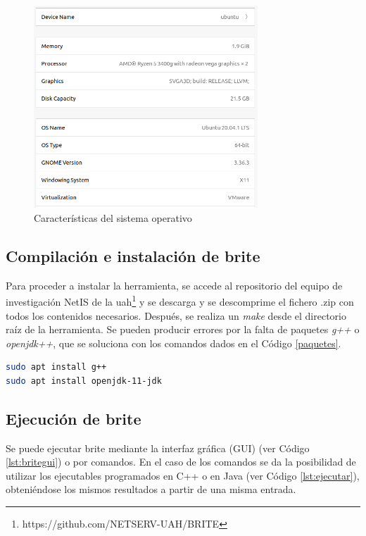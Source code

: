 \begin{figure}[h!]
    \centering
    \includegraphics[width=0.75\textwidth]{img/anexos/ubuntu.PNG}
    \caption{Características del sistema operativo}
    \label{fig:ubuntu}
\end{figure}

\subsection{Compilación e instalación de \acrshort{brite}}

Para proceder a instalar la herramienta, se accede al repositorio del equipo de investigación NetIS de la \gls{uah}\footnote{https://github.com/NETSERV-UAH/BRITE} y se descarga y se descomprime el fichero .zip con todos los contenidos necesarios. Después, se realiza un \textit{make} desde el directorio raíz de la herramienta. Se pueden producir errores por la falta de paquetes \textit{g++} o \textit{openjdk++}, que se soluciona con los comandos dados en el Código \ref{paquetes}.

\begin{lstlisting}[language=bash, style=Consola, caption={Instalación de paquetes}, label={paquetes}]
sudo apt install g++
sudo apt install openjdk-11-jdk
\end{lstlisting}

\subsection{Ejecución de \acrshort{brite}}

Se puede ejecutar \gls{brite} mediante la interfaz gráfica (GUI) (ver Código \ref{lst:britegui}) o por comandos. En el caso de los comandos se da la posibilidad de utilizar los ejecutables programados en C++ o en Java (ver Código \ref{lst:ejecutar}), obteniéndose los mismos resultados a partir de una misma entrada.

